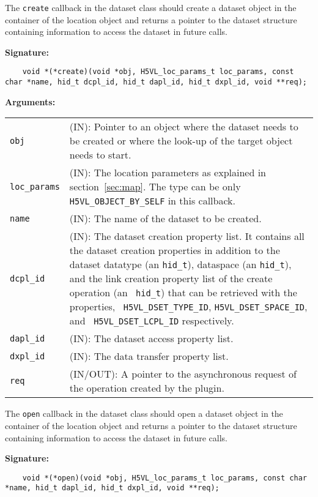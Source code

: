 The {\tt create} callback in the dataset class should create a dataset
object in the container of the location object and returns a pointer
to the dataset structure containing information to access the dataset
in future calls.

\textbf{Signature:}
\begin{lstlisting}
    void *(*create)(void *obj, H5VL_loc_params_t loc_params, const char *name, hid_t dcpl_id, hid_t dapl_id, hid_t dxpl_id, void **req);
\end{lstlisting}

\textbf{Arguments:}\\
\begin{tabular}{l p{10cm}}
  {\tt obj} & (IN): Pointer to an object where the dataset needs
  to be created or where the look-up of the target object needs to
  start.\\
  {\tt loc\_params} & (IN): The location parameters as explained in
  section~\ref{sec:map}. The type can be only {\tt
    H5VL\_OBJECT\_BY\_SELF} in this callback. \\
  {\tt name} & (IN): The name of the dataset to be created.\\
  {\tt dcpl\_id} & (IN): The dataset creation property list. It contains
  all the dataset creation properties in addition to the dataset
  datatype (an {\tt hid\_t}), dataspace (an {\tt hid\_t}), and the
  link creation property list of the create operation (an {\tt
    hid\_t}) that can be retrieved with the properties, {\tt
    H5VL\_DSET\_TYPE\_ID}, {\tt H5VL\_DSET\_SPACE\_ID},  and {\tt
    H5VL\_DSET\_LCPL\_ID} respectively.\\
  {\tt dapl\_id} & (IN): The dataset access property list.\\
  {\tt dxpl\_id} & (IN): The data transfer property list.\\
  {\tt req} & (IN/OUT): A pointer to the asynchronous request of the
  operation created by the plugin.\\
\end{tabular}

The {\tt open} callback in the dataset class should open a dataset
object in the container of the location object and returns a pointer
to the dataset structure containing information to access the dataset
in future calls.

\textbf{Signature:}
\begin{lstlisting}
    void *(*open)(void *obj, H5VL_loc_params_t loc_params, const char *name, hid_t dapl_id, hid_t dxpl_id, void **req);
\end{lstlisting}

